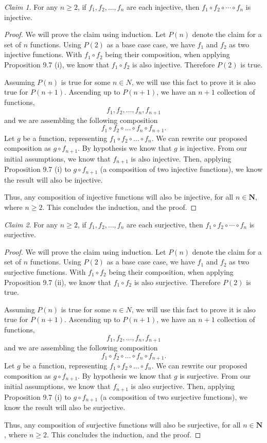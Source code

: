\documentclass[12pt,oneside]{amsart}
\theoremstyle{remark}
\newtheorem{claim}{Claim}[exer]
\newcommand{\bfN}{\mathbf{N}}
\begin{document}
\begin{claim}
For any $n \geq 2$, if $f_1, f_2, \dotsc, f_n$ are each injective, then $f_1 \circ f_2 \circ \dotsb \circ f_n$ is injective.
\end{claim}
\begin{proof}
We will prove the claim using induction. Let $P(n)$ denote the claim for a set of $n$ functions. Using $P(2)$ as a base case case, we have $f_1$ and $f_2$ as two injective functions. With $f_1 \circ f_2$ being their composition, when applying Proposition 9.7 (i), we know that $f_1 \circ f_2$ is also injective. Therefore $P(2)$ is true.

Assuming $P(n)$ is true for some $n \in N$, we will use this fact to prove it is also true for $P(n + 1)$. Ascending up to $P(n + 1)$, we have an $n + 1$ collection of functions, \[ f_1, f_2, \dotsc, f_n, f_{n + 1} \] and we are assembling the following composition \[ f_1 \circ f_2 \circ \dotsc \circ f_n \circ f_{n + 1}. \] Let $g$ be a function, representing $f_1 \circ f_2 \circ \dotsc \circ f_n$. We can rewrite our proposed composition as $g \circ f_{n + 1}.$ By hypothesis we know that $g$ is injective. From our initial assumptions, we know that $f_{n + 1}$ is also injective. Then, applying Proposition 9.7 (i) to $g \circ f_{n + 1}$ (a composition of two injective functions), we know the result will also be injective.

Thus, any composition of injective functions will also be injective, for all $n \in \bfN$, where $n \geq 2$. This concludes the induction, and the proof.
\end{proof}

\begin{claim}
For any $n \geq 2$, if $f_1, f_2, \dotsc, f_n$ are each surjective, then $f_1 \circ f_2 \circ \dotsb \circ f_n$ is surjective.
\end{claim}
\begin{proof}
We will prove the claim using induction. Let $P(n)$ denote the claim for a set of $n$ functions. Using $P(2)$ as a base case case, we have $f_1$ and $f_2$ as two surjective functions. With $f_1 \circ f_2$ being their composition, when applying Proposition 9.7 (ii), we know that $f_1 \circ f_2$ is also surjective. Therefore $P(2)$ is true.

Assuming $P(n)$ is true for some $n \in N$, we will use this fact to prove it is also true for $P(n + 1)$. Ascending up to $P(n + 1)$, we have an $n + 1$ collection of functions, \[ f_1, f_2, \dotsc, f_n, f_{n + 1} \] and we are assembling the following composition \[ f_1 \circ f_2 \circ \dotsc \circ f_n \circ f_{n + 1}. \] Let $g$ be a function, representing $f_1 \circ f_2 \circ \dotsc \circ f_n$. We can rewrite our proposed composition as $g \circ f_{n + 1}.$ By hypothesis we know that $g$ is surjective. From our initial assumptions, we know that $f_{n + 1}$ is also surjective. Then, applying Proposition 9.7 (i) to $g \circ f_{n + 1}$ (a composition of two surjective functions), we know the result will also be surjective.

Thus, any composition of surjective functions will also be surjective, for all $n \in \bfN$, where $n \geq 2$. This concludes the induction, and the proof.
\end{proof}
\end{document}
